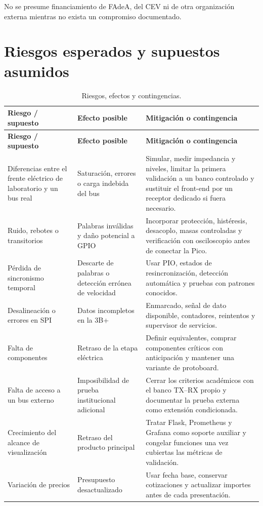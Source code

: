 \documentclass[12pt,a4paper,oneside]{article}
\begin{document}
No se presume financiamiento de FAdeA, del CEV ni de otra organización externa mientras no exista un compromiso documentado.

\section{Riesgos esperados y supuestos asumidos}

\begin{longtable}{>{\raggedright\arraybackslash}p{4.0cm}>{\raggedright\arraybackslash}p{4.3cm}>{\raggedright\arraybackslash}p{5.0cm}}
  \caption{Riesgos, efectos y contingencias.}\label{tab:riesgos}\\
  \toprule
  \textbf{Riesgo / supuesto} & \textbf{Efecto posible} & \textbf{Mitigación o contingencia} \\
  \midrule
  \endfirsthead
  \toprule
  \textbf{Riesgo / supuesto} & \textbf{Efecto posible} & \textbf{Mitigación o contingencia} \\
  \midrule
  \endhead
  Diferencias entre el frente eléctrico de laboratorio y un bus real & Saturación, errores o carga indebida del bus & Simular, medir impedancia y niveles, limitar la primera validación a un banco controlado y sustituir el front-end por un receptor dedicado si fuera necesario. \\
  Ruido, rebotes o transitorios & Palabras inválidas y daño potencial a GPIO & Incorporar protección, histéresis, desacoplo, masas controladas y verificación con osciloscopio antes de conectar la Pico. \\
  Pérdida de sincronismo temporal & Descarte de palabras o detección errónea de velocidad & Usar PIO, estados de resincronización, detección automática y pruebas con patrones conocidos. \\
  Desalineación o errores en SPI & Datos incompletos en la 3B+ & Enmarcado, señal de dato disponible, contadores, reintentos y supervisor de servicios. \\
  Falta de componentes & Retraso de la etapa eléctrica & Definir equivalentes, comprar componentes críticos con anticipación y mantener una variante de protoboard. \\
  Falta de acceso a un bus externo & Imposibilidad de prueba institucional adicional & Cerrar los criterios académicos con el banco TX--RX propio y documentar la prueba externa como extensión condicionada. \\
  Crecimiento del alcance de visualización & Retraso del producto principal & Tratar Flask, Prometheus y Grafana como soporte auxiliar y congelar funciones una vez cubiertas las métricas de validación. \\
  Variación de precios & Presupuesto desactualizado & Usar fecha base, conservar cotizaciones y actualizar importes antes de cada presentación. \\
  \bottomrule
\end{longtable}
\end{document}
